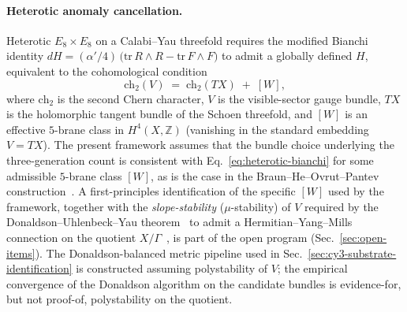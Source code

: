 ﻿\documentclass[reprint,amsmath,amssymb,aps,prd,longbibliography,floatfix]{revtex4-2}
\begin{document}
\paragraph{Heterotic anomaly cancellation.}
Heterotic $E_8 \times E_8$ on a Calabi--Yau threefold requires
the modified Bianchi identity
$dH = (\alpha'/4)\,\bigl(\text{tr}\,R \wedge R
- \text{tr}\,F \wedge F\bigr)$
to admit a globally defined $H$, equivalent to the cohomological
condition
\begin{equation}
\text{ch}_2(V) \;=\; \text{ch}_2(TX) \;+\; [W],
\label{eq:heterotic-bianchi}
\end{equation}
where $\text{ch}_2$ is the second Chern character, $V$ is the
visible-sector gauge bundle, $TX$ is the holomorphic tangent
bundle of the Schoen threefold, and $[W]$ is an effective
$5$-brane class in $H^4(X, \mathbb{Z})$ (vanishing in the standard
embedding $V = TX$). The present framework assumes that the
bundle choice underlying the three-generation count is consistent
with Eq.~\eqref{eq:heterotic-bianchi} for some admissible
$5$-brane class $[W]$, as is the case in the
Braun--He--Ovrut--Pantev construction~\cite{BraunHeOvrutPantev2005}.
A first-principles identification of the specific
$[W]$ used by the framework, together with the
\emph{slope-stability} ($\mu$-stability) of $V$ required by the
Donaldson--Uhlenbeck--Yau theorem~\cite{DonaldsonStability,UhlenbeckYau}
to admit a Hermitian--Yang--Mills connection on the quotient
$X/\Gamma$~\cite{DonagiOvrut2005}, is part of the open program
(Sec.~\ref{sec:open-items}). The Donaldson-balanced metric
pipeline used in Sec.~\ref{sec:cy3-substrate-identification} is
constructed assuming polystability of $V$; the empirical
convergence of the Donaldson algorithm on the candidate bundles is
evidence-for, but not proof-of, polystability on the quotient.
\end{document}
